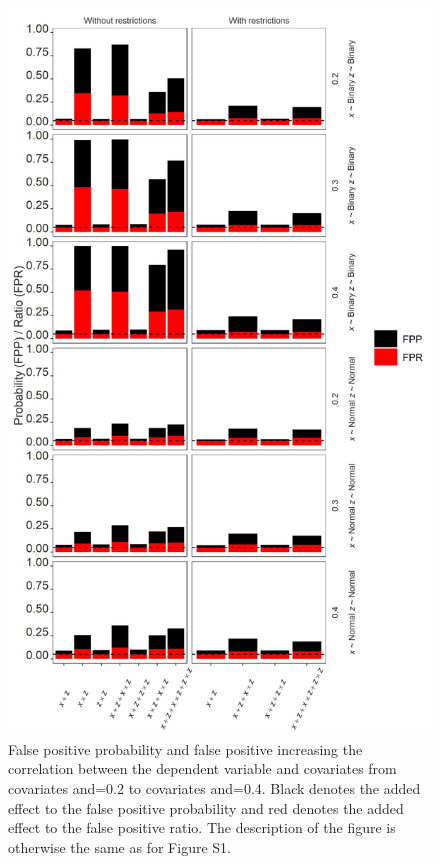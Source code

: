 \begin{figure}[hbt!]
\includegraphics[scale=0.4]{R/Analysis/Result/Figures/Figure2SI.jpeg}
\centering
\caption{False positive probability and false positive increasing the correlation between the dependent variable and covariates from covariates and=0.2 to covariates and=0.4. Black denotes the added effect to the false positive probability and red denotes the added effect to the false positive ratio.  The description of the figure is otherwise the same as for Figure S1.}
\label{fig:mainfigure}
\end{figure}



